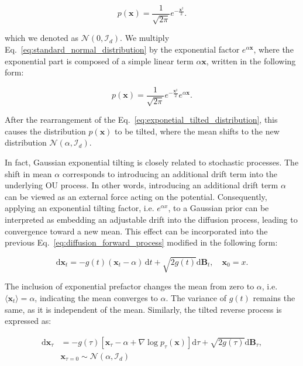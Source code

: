 \documentclass[aip,jcp,reprint,longbibliography]{revtex4-1}
\begin{document}
\begin{equation}
    p(\mathbf{x}) = \frac{1}{\sqrt{2\pi}} e^{-\frac{\mathbf{x}^2}{2}}.
    \label{eq:standard_normal_distribution}
\end{equation}

\noindent which we denoted as $\mathcal{N}(0,\mathcal{I}_d)$. We multiply Eq.~\ref{eq:standard_normal_distribution} by the exponential factor $e^{\alpha \mathbf{x}}$, where the exponential part is composed of a simple linear term $\alpha \mathbf{x}$, written in the following form: 

\begin{equation}
    p(\mathbf{x}) = \frac{1}{\sqrt{2\pi}} e^{-\frac{\mathbf{x}^2}{2}}e^{\alpha \mathbf{x}}.
    \label{eq:exponetial_tilted_distribution}
\end{equation}


\noindent After the rearrangement of the Eq.~\ref{eq:exponetial_tilted_distribution}, this causes the distribution $p(\mathbf{x})$ to be tilted, where the mean shifts to the new distribution $\mathcal{N}(\alpha,\mathcal{I}_d)$.


In fact, Gaussian exponential tilting is closely related to stochastic processes. The shift in mean $\alpha$ corresponds to introducing an additional drift term into the underlying OU process. In other words, introducing an additional drift term $\alpha$ can be viewed as an external force acting on the potential. Consequently, applying an exponential tilting factor, i.e. $e^{\alpha x}$,  to a Gaussian prior can be interpreted as embedding an adjustable drift into the diffusion process, leading to convergence toward a new mean. This effect can be incorporated into the previous Eq.~\ref{eq:diffusion_forward_process} modified in the following form:

\begin{equation} 
\mathrm{d}\mathbf{x}_t = -g(t) (\mathbf{x}_t -\alpha)\,\mathrm{d}t + \sqrt{2g(t)} \mathrm{d}\mathbf{B}_t, \quad \mathbf{x}_0 = x.
\label{eq:forward_force}
\end{equation}

The inclusion of exponential prefactor changes the mean from zero to $\alpha$, i.e. $\langle \mathbf{x}_t \rangle = \alpha$, indicating the mean converges to $\alpha$. The variance of $g(t)$ remains the same, as it is independent of the mean. Similarly, the tilted reverse process is expressed as: 


\begin{equation}
\begin{aligned}
\mathrm{d}\mathbf{x}_\tau &= -g(\tau)\left[\mathbf{x}_\tau -\alpha + \nabla \log p_\tau
(\mathbf{x})\right] \mathrm{d}\tau + \sqrt{2g(\tau)} \mathrm{d}\mathbf{B}_\tau, 
\\
\quad &\mathbf{x}_{\tau=0}  \sim \mathcal{N}(\alpha, \mathcal{I}_d)
\label{eq:reverse_force}
\end{aligned}
\end{equation}
\end{document}
